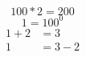 \documentclass{article}
\begin{document}
	\begin{equation*}
	100 * 2 = 200
	\end{equation*}
	\begin{equation*}
	1 = 100^0
	\end{equation*}
	\begin{align*}
	    1 + 2 &= 3\\
	    1 &= 3 - 2
	\end{align*}    
\end{document}
